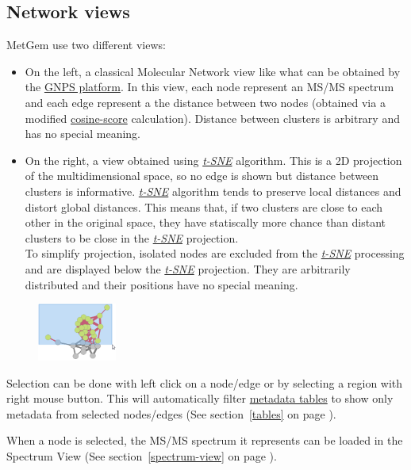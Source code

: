 \documentclass[12pt,a4paper,titlepage,dvipsnames]{article}
\newcommand*{\appname}{MetGem }
\newcommand*{\tsne}{{\em\href{https://en.wikipedia.org/wiki/T-distributed_stochastic_neighbor_embedding}{t-SNE}} }
\newcommand*{\img}[1]{%
    \raisebox{-.3\baselineskip}{%
        \texttt{[image: \#1]}%
    }%
}
\begin{document}
\subsection{Network views}
\label{networkviews}
\appname use two different views:
\begin{itemize}
	\item On the left, a classical Molecular Network view like what can be obtained by the \href{https://gnps.ucsd.edu}{GNPS platform}. In this view, each node represent an MS/MS spectrum and each edge represent a the distance between two nodes (obtained via a modified \href{https://en.wikipedia.org/wiki/Cosine_similarity}{cosine-score} calculation). Distance between clusters is arbitrary and has no special meaning.
	\item On the right, a view obtained using \tsne algorithm. This is a 2D projection of the multidimensional space, so no edge is shown but distance between clusters is informative. \tsne algorithm tends to preserve local distances and distort global distances. This means that, if two clusters are close to each other in the original space, they have statiscally more chance than distant clusters to be close in the \tsne projection.\\
	To simplify projection, isolated nodes are excluded from the \tsne processing and are displayed below the \tsne projection. They are arbitrarily distributed and their positions have no special meaning.
\end{itemize}

\begin{figure}
    \vspace{-.5cm}
	\includegraphics[width=0.23\textwidth]{make-selection}
\end{figure}

Selection can be done with \img{mouse-left-click} left click on a node/edge or by selecting a region with \img{mouse-right-click} right mouse button. This will automatically filter \hyperref[tables]{metadata tables} to show only metadata from selected nodes/edges (See section~\ref{tables} on page \pageref{tables}).

When a node is selected, the MS/MS spectrum it represents can be loaded in the Spectrum View (See section~\ref{spectrum-view} on page \pageref{spectrum-view}).
\end{document}
